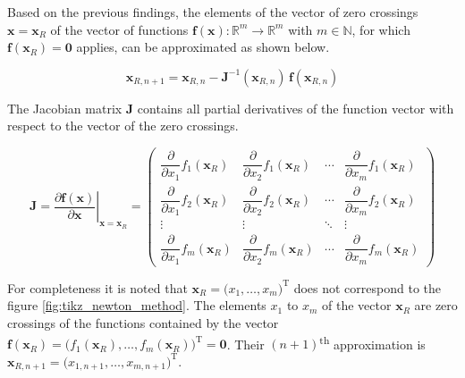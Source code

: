 Based on the previous findings, the elements of the vector of zero crossings $\mathrm{\mathbf{x}} = \mathrm{\mathbf{x}}_R$ of the vector of functions $\mathrm{\mathbf{f}} \left( \mathrm{\mathbf{x}} \right) : \mathbb{R}^m \to \mathbb{R}^m$ with $m \in \mathbb{N}$, for which $\mathrm{\mathbf{f}}\left( \mathrm{\mathbf{x}}_R \right) = \mathbf{0}$ applies, can be approximated as shown below.
\begin{center}
	\begin{equation} \label{eq:vect_x_approx}
		\mathrm{\mathbf{x}}_{R, n + 1} = \mathrm{\mathbf{x}}_{R,n} 	- \mathrm{\mathbf{J}}^{-1}\left( \mathrm{\mathbf{x}}_{R,n} \right) \, \mathrm{\mathbf{f}}\left( \mathrm{\mathbf{x}}_{R,n} \right) 
	\end{equation}
\end{center}
The Jacobian matrix $\mathrm{\mathbf{J}}$ contains all partial derivatives of the function vector with respect to the vector of the zero crossings.
\begin{center}
	\begin{equation} \label{eq:jacobian}
		\mathrm{\mathbf{J}} = \left. \dfrac{\partial \mathrm{\mathbf{f}}\left(\mathrm{\mathbf{x}}\right)}{\partial \mathrm{\mathbf{x}}} \right|_{\mathrm{\mathbf{x}} = \mathrm{\mathbf{x}}_R} = 
 		\begin{pmatrix}
  			\dfrac{\partial}{\partial x_1} f_1\left( \mathrm{\mathbf{x}}_R \right) & \dfrac{\partial}{\partial x_2} f_1\left( \mathrm{\mathbf{x}}_R \right) & \cdots & \dfrac{\partial}{\partial x_m} f_1\left( \mathrm{\mathbf{x}}_R \right) \\
			\dfrac{\partial}{\partial x_1} f_2\left( \mathrm{\mathbf{x}}_R \right) & \dfrac{\partial}{\partial x_2} f_2\left( \mathrm{\mathbf{x}}_R \right) & \cdots & \dfrac{\partial}{\partial x_m} f_2\left( \mathrm{\mathbf{x}}_R \right) \\
			\vdots & \vdots & \ddots & \vdots \\
  			\dfrac{\partial}{\partial x_1} f_m\left( \mathrm{\mathbf{x}}_R \right) & \dfrac{\partial}{\partial x_2} f_m\left( \mathrm{\mathbf{x}}_R \right) & \cdots & \dfrac{\partial}{\partial x_m} f_m\left( \mathrm{\mathbf{x}}_R \right) 
 		\end{pmatrix}
 	\end{equation}
\end{center}
For completeness it is noted that $ \mathrm{\mathbf{x}}_R = \big( x_1, \dotsc, x_m \big)^{\mathrm T } $ does not correspond to the figure \ref{fig:tikz_newton_method}. The elements $x_1$ to $x_m$ of the vector $\mathrm{\mathbf{x}}_R$ are zero crossings of the functions contained by the vector $\mathrm{\mathbf{f}} \left( \mathrm{\mathbf{x}}_R \right) = \big( f_1\left( \mathrm{\mathbf{x}}_R \right), \dotsc, f_m\left( \mathrm{\mathbf{x}}_R \right) \big)^{\mathrm T } = \mathbf{0}$. Their $\left(n + 1\right)$\textsuperscript{th} approximation is $\mathrm{\mathbf{x}}_{R,n + 1} = \big( x_{1,n + 1}, \dotsc, x_{m,n + 1} \big)^{\mathrm T}$.

